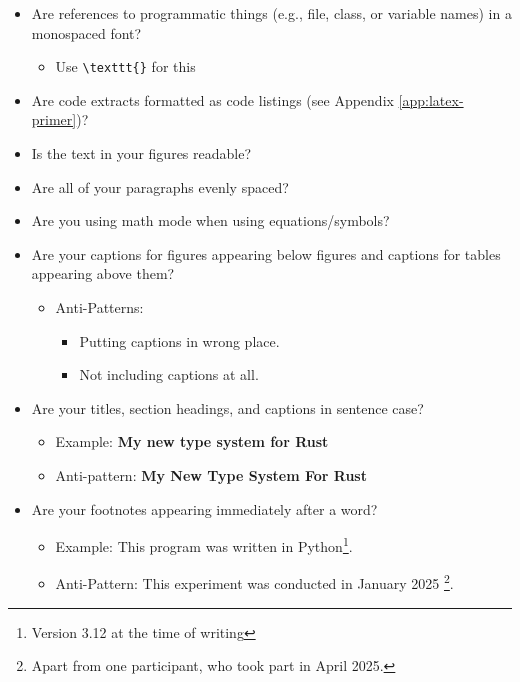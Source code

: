 \begin{itemize}
    \item Are references to programmatic things (e.g., file, class, or variable names) in a monospaced font?
    \begin{itemize}
        \item Use \texttt{\textbackslash texttt\{\}} for this
    \end{itemize}

    \item Are code extracts formatted as code listings (see Appendix \ref{app:latex-primer})?
    
    \item Is the text in your figures readable?  

    \item Are all of your paragraphs evenly spaced?  

    \item Are you using math mode when using equations/symbols?  

    \item Are your captions for figures appearing below figures and captions for tables appearing above them?
    \begin{itemize}
        \item Anti-Patterns:
        \begin{itemize}
            \item Putting captions in wrong place.
            \item Not including captions at all.
        \end{itemize}
    \end{itemize}

    \item Are your titles, section headings, and captions in sentence case?
    \begin{itemize}
        \item Example: \textbf{My new type system for Rust}
        \item Anti-pattern: \textbf{My New Type System For Rust}
    \end{itemize}

    \item Are your footnotes appearing immediately after a word?
    \begin{itemize}
        \item Example: This program was written in Python\footnote{Version 3.12 at the time of writing}.
        \item Anti-Pattern: This experiment was conducted in January 2025 \footnote{Apart from one participant, who took part in April 2025.}.
    \end{itemize}


\end{itemize}
